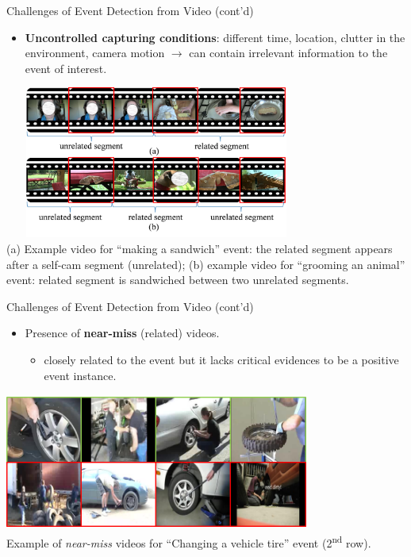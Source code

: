 \documentclass{beamer}
\begin{document}
\begin{frame}[t]{Challenges of Event Detection from Video (cont'd)}
	\begin{itemize}
		\item \textbf{Uncontrolled capturing conditions}: different time, location, clutter in the environment, camera motion $\rightarrow$ can contain irrelevant information to the event of interest.
	\end{itemize}
	\begin{center}
		\includegraphics[width=10cm,height=5cm]{images/part1/uncontrolled.png}
		\\
		\footnotesize{(a) Example video for ``making a sandwich'' event: the related segment appears after a self-cam segment (unrelated); (b) example video for ``grooming an animal'' event: related segment is sandwiched between two unrelated segments.}
	\end{center}
	
\end{frame}


\begin{frame}[t]{Challenges of Event Detection from Video (cont'd)}
	
	\begin{itemize}
		\item Presence of \textbf{near-miss} (related) videos.
			\begin{itemize}
	\item closely related to the event but it lacks critical evidences to be a positive event instance.
			\end{itemize}
	\end{itemize}
	
	\begin{center}
		\includegraphics[width=10cm,height=4.5cm]{images/part1/nearmiss.png}
		\\
			\footnotesize{Example of \textit{near-miss} videos for ``Changing a vehicle tire'' event (2\textsuperscript{nd} row).}
	\end{center}
\end{frame}
\end{document}
